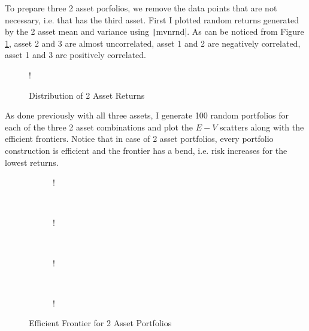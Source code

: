 \documentclass[11pt]{article}
\begin{document}
To prepare three 2 asset porfolios, we remove the data points that are not necessary, i.e. that has
the third asset. First I plotted random returns generated by the 2 asset mean and variance using
\texttt|mvnrnd|. As can be noticed from Figure \ref{fig:q1-b-return-distribution}, asset
2 and 3 are almost uncorrelated, asset 1 and 2 are negatively correlated, asset 1 and 3 are positively
correlated.\\

\begin{figure}[!h]
	\vspace{-0.5cm}
	\centering 
	 {!} { }
	\caption{Distribution of 2 Asset Returns}
	\label{fig:q1-b-return-distribution}
	\vspace{-0.5cm}
\end{figure}

As done previously with all three assets, I generate 100 random portfolios for each of the three 2 asset
combinations and plot the $E-V$ scatters along with the efficient frontiers. Notice that in case of 2 asset portfolios, every portfolio construction is efficient and the frontier
has a bend, i.e. risk increases for the lowest returns.\\

\begin{figure}[!h]
   \centering 
   \begin{subfigure}[b]{0.23\textwidth}
     	\resizebox {\textwidth} {!} { }
		\label{fig:q1-b-efficient-frontier-1}
    \end{subfigure}
    ~
    \begin{subfigure}[b]{0.23\textwidth}
       	\resizebox {\textwidth} {!} { }
        \label{fig:q1-b-efficient-frontier-2}
    \end{subfigure}
	~
    \begin{subfigure}[b]{0.23\textwidth}
       	\resizebox {\textwidth} {!} { }
        \label{fig:q1-b-efficient-frontier-3}
    \end{subfigure}
	~
    \begin{subfigure}[b]{0.23\textwidth}
       	\resizebox {\textwidth} {!} { }
        \label{fig:q1-b-efficient-frontier-all}
    \end{subfigure}
	\vspace{-0.5cm}
    \caption{Efficient Frontier for 2 Asset Portfolios}\label{fig:naive_v_cvx}
\end{figure}
\end{document}
